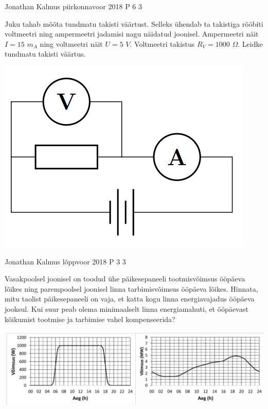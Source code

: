 \documentclass[11pt]{article}
\begin{document}
{%
{Jonathan Kalmus} %
{piirkonnavoor} %
{2018} %
{P 6} %
{3} %
{
\ifStatement
Juku tahab mõõta tundmatu takisti väärtust. Selleks ühendab ta takistiga rööbiti voltmeetri ning ampermeetri jadamisi nagu näidatud joonisel. Ampermeetri näit $I = 15$ $m_A$ ning voltmeetri näit $U = 5$  $V$. Voltmeetri takistus $R_V = 1000$ $\Omega$. Leidke tundmatu takisti väärtus.
\begin{center}
	\includegraphics[width=0.5\linewidth]{2018-v2p-06-yl.png}
\end{center}
\fi
}

{Jonathan Kalmus} %
{lõppvoor} %
{2018} %
{P 3} %
{3} %
{
\ifStatement
Vasakpoolsel joonisel on toodud ühe päikesepaneeli tootmisvõimsus ööpäeva lõikes ning parempoolsel joonisel linna tarbimisvõimsus ööpäeva lõikes. Hinnata, mitu taolist päikesepaneeli on vaja, et katta kogu linna energiavajadus ööpäeva jooksul. Kui suur peab olema minimaalselt linna energiamahuti, et ööpäevast kõikumist tootmise ja tarbimise vahel kompenseerida?
\begin{center}
	\includegraphics[width=0.5\linewidth]{2018-v3p-03-yl.png}
\end{center}
\fi
}

}
\end{document}
